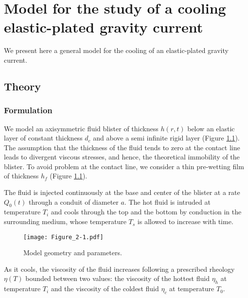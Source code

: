 \chapter{Model  for  the study  of  a  cooling elastic-plated  gravity
  current}
\label{chap3}
\minitoc

We present here  a general model for the cooling  of an elastic-plated
gravity current. 

\section{Theory}
\label{sec:theory}

\subsection{Formulation}
\label{sec:formulation}

We model an axisymmetric fluid  blister of thickness $h(r,t)$ below an
elastic layer  of constant thickness  $d_c$ and above a  semi infinite
rigid  layer  \citep{Michaut:2011kg}  (Figure  \ref{Figure2-1}).   The
assumption  that the  thickness  of the  fluid tends  to  zero at  the
contact  line leads  to  divergent viscous  stresses,  and hence,  the
theoretical immobility of the blister. To avoid problem at the contact
line,  we  consider  a  thin   pre-wetting  film  of  thickness  $h_f$
\citep{Flitton:1999iv,Lister:2013ia} (Figure \ref{Figure2-1}).

The  fluid is  injected continuously  at the  base and  center of  the
blister at a rate $Q_0(t)$ through a conduit of diameter
$a$. The hot fluid is intruded  at temperature $T_i$ and cools through
the top and the bottom by  conduction in the surrounding medium, whose
temperature $T_s$ is allowed to increase with time.

\begin{figure}[htbp]
  \begin{center}
    \graphicspath{ {/Users/thorey/Documents/These/Projet/Refroidissement/Skin_Model/Paper/Figure/Draft_2/} }
    \texttt{[image: Figure\_2-1.pdf]}
    \caption{Model geometry and parameters.}
    \label{Figure2-1}
  \end{center}
\end{figure}

As  it  cools,  the  viscosity  of the  fluid  increases  following  a
prescribed  rheology   $\eta(T)$  bounded  between  two   values:  the
viscosity of the  hottest fluid $\eta_h$ at temperature  $T_i$ and the
viscosity of the coldest fluid $\eta_c$ at temperature $T_0$.

